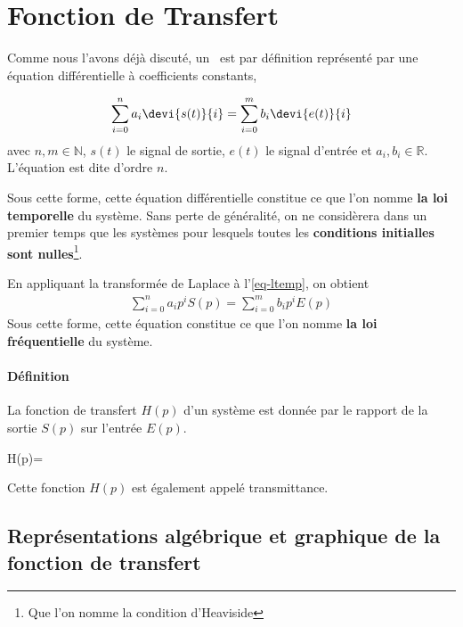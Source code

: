 \section{Fonction de Transfert}

Comme nous l'avons déjà discuté, un \SLCI~est par définition représenté par 
une équation différentielle 
à coefficients constants,

\begin{align}
    \sum_{i=0}^{n}a_i\devi{s(t)}{i}=\sum_{i=0}^{m}b_i\devi{e(t)}{i}\label{eq-ltemp}
\end{align}
avec $n,m\in\mathbb{N}$, $s(t)$ le signal de sortie, $e(t)$ le signal d'entrée et $a_i,b_i\in\mathbb{R}$.
L'équation est dite d'ordre $n$.

Sous cette forme, cette équation différentielle constitue ce que l'on nomme \textbf{la loi temporelle} du système.
Sans perte de généralité, on ne considèrera dans un premier temps 
que les systèmes pour lesquels toutes les 
\textbf{conditions initialles sont nulles}\footnote{Que l'on nomme la condition d'Heaviside}.

En appliquant la transformée de Laplace à l'\cref{eq-ltemp}, on obtient
\begin{align}
    \sum_{i=0}^{n}a_ip^iS(p)=\sum_{i=0}^{m}b_ip^iE(p)\label{eq-lfreq}
\end{align}
Sous cette forme, cette équation constitue ce que l'on nomme \textbf{la loi fréquentielle} du système.

\paragraph{Définition}

La fonction de transfert $H(p)$ d'un système est donnée par le rapport de la 
sortie $S(p)$ sur l'entrée $E(p)$. 
\begin{bequation}
H(p)=
\end{bequation}
Cette fonction $H(p)$ est également appelé transmittance.

\subsection[Représentation de la fonction de transfert]{Représentations algébrique et graphique de la fonction de transfert}

